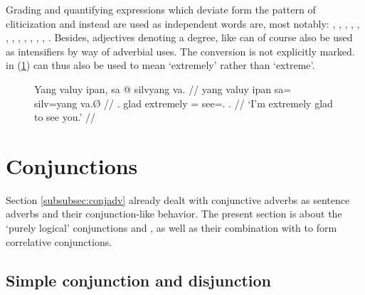 Grading and quantifying expressions which deviate form the pattern of 
cliticization and instead are used as independent words are, most notably:
,
,
,
,
,
,
,
,
,
,
,
,
.
Besides, adjectives denoting a degree, like  can of course also be used as intensifiers by way of adverbial uses.
The conversion is not explicitly marked.  in
(\ref{ex:adjasadv}) can thus also be used to mean `extremely' rather than
`extreme'.

\begin{figure}[h]
\ex\label{ex:adjasadv}
\begingl
	\gla Yang valuy ipan, sa @ silvyang va. //
	\glb yang valuy ipan sa= silv=yang va.Ø //
	\glc \Fsg{}.\Aarg{} glad extremely \PatT{}= see=\Fsg{}.\Aarg{} 
		\Second{}.\Top{} //
	\glft `I'm extremely glad to see you.' //
\endgl
\xe
\end{figure}


\section{Conjunctions}
\label{sec:conjunctions}

Section \ref{subsubsec:conjadv} already dealt with conjunctive adverbs as
sentence adverbs and their conjunction-like behavior. The present section is
about the `purely logical' conjunctions  and
, as well as their combination with 
 to form correlative conjunctions.

\subsection{Simple conjunction and disjunction}

